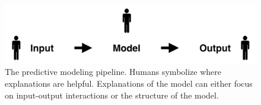 \begin{figure}[b!]
\centering
\includegraphics[width=0.7\linewidth]{figs/motivation/flow}
\caption{
The predictive modeling pipeline.
Humans symbolize where explanations are helpful.
Explanations of the model can either focus on input-output interactions
or the structure of the model.
}
\label{figs:motivation_flow}
\end{figure}